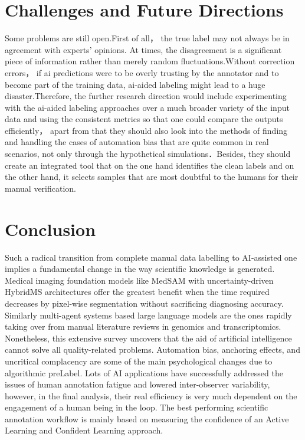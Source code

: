 \documentclass[10pt, conference, letterpaper]{IEEEtran}
\newif\ifshowadded
\newcommand{\added}[1]{\ifshowadded{\color{blue}#1}\else #1\fi}
\begin{document}
\section{Challenges and Future Directions}
\label{sec:future}
\added{Some problems are still open.First of all， the true label may not always be in agreement with experts' opinions. At times, the disagreement is a significant piece of information rather than merely random fluctuations.Without correction errors， if ai predictions were to be overly trusting by the annotator and to become part of the training data, ai-aided labeling might lead to a huge disaster.Therefore, the further research direction would include experimenting with the ai-aided labeling approaches over a much broader variety of the input data and using the consistent metrics so that one could compare the outputs efficiently， apart from that they should also look into the methods of finding and handling the cases of automation bias that are quite common in real scenarios, not only through the hypothetical simulations．Besides, they should create an integrated tool that on the one hand identifies the clean labels and on the other hand, it selects samples that are most doubtful to the humans for their manual verification.}

\section{Conclusion}
\label{sec:conclusion}
Such a radical transition from complete manual data labelling to AI-assisted one implies a fundamental change in the way scientific knowledge is generated. Medical imaging foundation models like MedSAM with uncertainty-driven HybridMS architectures offer the greatest benefit when the time required decreases by pixel-wise segmentation without sacrificing diagnosing accuracy. Similarly multi-agent systems based large language models are the ones rapidly taking over from manual literature reviews in genomics and transcriptomics.
Nonetheless, this extensive survey uncovers that the aid of artificial intelligence cannot solve all quality-related problems. Automation bias, anchoring effects, and uncritical complacency are some of the main psychological changes due to algorithmic preLabel.
Lots of AI applications have successfully addressed the issues of human annotation fatigue and lowered inter-observer variability, however, in the final analysis, their real efficiency is very much dependent on the engagement of a human being in the loop. The best performing scientific annotation workflow is mainly based on measuring the confidence of an Active Learning and Confident Learning approach.
\end{document}
